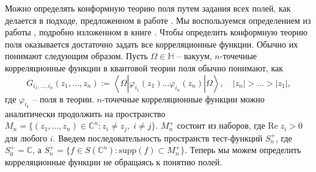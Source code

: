 Можно определять конформную теорию поля путем задания всех полей, как делается в подходе, предложенном в работе \cite{moore1989classical}. Мы воспользуемся определением из работы \cite{felder1989structure}, подробно изложенном в книге \cite{schottenloher2008mathematical}. Чтобы определить конформную теорию поля оказывается достаточно задать все корреляционные функции. Обычно их понимают следующим образом.   Пусть $\Omega\in\mathbb{H}$ -- вакуум, $n$-точечные корреляционные функции в квантовой теории поля обычно понимают, как
\begin{equation}
  \label{eq:50}
  G_{i_{1},\dots ,i_{n}}(z_{1},\dots,z_{n}):=\left<\Omega|\varphi_{i_{1}}(z_{1})\dots \varphi_{i_{n}}(z_{n})|\Omega\right>, \quad |z_{n}|>\dots > |z_{1}|,
\end{equation}
где $\varphi_{i_{k}}$ -- поля в теории.
$n$-точечные корреляционные функции можно аналитически продолжить на пространство $M_{n}=\{(z_{1},\dots,z_{n})\in \mathbb{C}^{n}: z_{i}\neq z_{j},\; i\neq j\}$. $M_{n}^{+}$ состоит из наборов, где $\mathrm{Re}\;z_{i}>0$ для любого $i$. Введем последовательность пространств тест-функций $S_{n}^{+}$, где $S_{0}^{+}=\mathbb{C}$, а $S_{n}^{+}=\{f\in S(\mathbb{C}^{n}): \mathrm{supp}(f)\subset M^{+}_{n}\} $. Теперь мы можем определить корреляционные функции не обращаясь к понятию полей. 

